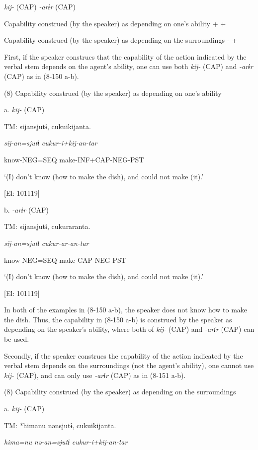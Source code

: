   \textit{kij-} (CAP)  \textit{{}-arɨr} (CAP)

Capability construed (by the speaker) as depending on one’s ability  +  +

Capability construed (by the speaker) as depending on the surroundings  {}-  +

First, if the speaker construes that the capability of the action indicated by the verbal stem depends on the agent’s ability, one can use both \textit{kij-} (CAP) and \textit{{}-arɨr} (CAP) as in (8-150 a-b).

(8)  Capability construed (by the speaker) as depending on one’s ability

  a. \textit{kij-} (CAP)

  TM:  sijansjutɨ,  cukuikijanta.

    \textit{sij-an=sjutɨ}  \textit{cukur-i+kij{}-an-tar}

    know-NEG=SEQ  make-INF+CAP-NEG-PST

    ‘(I) don’t know (how to make the dish), and could not make (it).’

    [El: 101119]

  b. \textit{{}-arɨr} (CAP)

  TM:  sijansjutɨ,  cukuraranta.

    \textit{sij-an=sjutɨ}  \textit{cukur-ar{}-an-tar}

    know-NEG=SEQ  make-CAP-NEG-PST

    ‘(I) don’t know (how to make the dish), and could not make (it).’

    [El: 101119]

In both of the examples in (8-150 a-b), the speaker does not know how to make the dish. Thus, the capability in (8-150 a-b) is construed by the speaker as depending on the speaker’s ability, where both of \textit{kij-} (CAP) and \textit{{}-arɨr} (CAP) can be used.

Secondly, if the speaker construes the capability of the action indicated by the verbal stem depends on the surroundings (not the agent’s ability), one cannot use \textit{kij-} (CAP), and can only use \textit{{}-arɨr} (CAP) as in (8-151 a-b).

(8)  Capability construed (by the speaker) as depending on the surroundings

  a. \textit{kij-} (CAP)

  TM:  *himanu  nənsjutɨ,  cukuikijanta.

    \textit{hima=nu}  \textit{nə-an=sjutɨ}  \textit{cukur-i+kij{}-an-tar}


